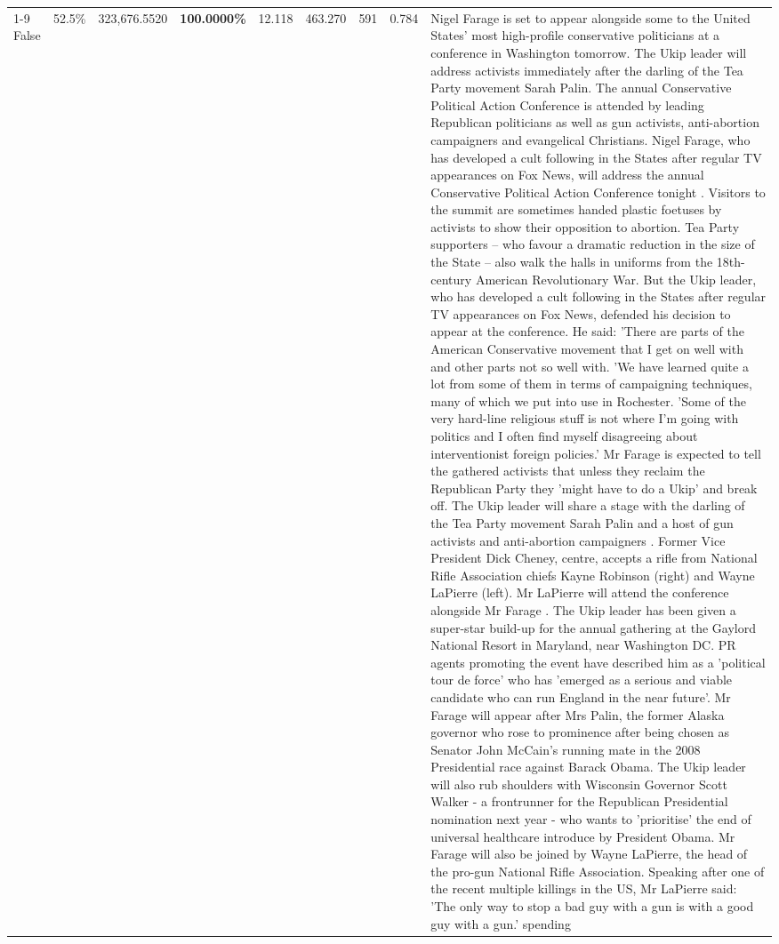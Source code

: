 \begin{table}[H]
\begin{tabular}{lllrlllll}
\cline{1-9}
False & 52.5\% & 323,676.5520 & \bfseries \color{red} 100.0000\% & 12.118 & 463.270 & 591 & 0.784 & Nigel Farage is set to appear alongside some to the United States' most high-profile conservative politicians at a conference in Washington tomorrow. The Ukip leader will address activists immediately after the darling of the Tea Party movement Sarah Palin. The annual Conservative Political Action Conference is attended by leading Republican politicians as well as gun activists, anti-abortion campaigners and evangelical Christians. Nigel Farage, who has developed a cult following in the States after regular TV appearances on Fox News, will address the annual Conservative Political Action Conference tonight . Visitors to the summit are sometimes handed plastic foetuses by activists to show their opposition to abortion. Tea Party supporters – who favour a dramatic reduction in the size of the State – also walk the halls in uniforms from the 18th-century American Revolutionary War. But the Ukip leader, who has developed a cult following in the States after regular TV appearances on Fox News, defended his decision to appear at the conference. He said: 'There are parts of the American Conservative movement that I get on well with and other parts not so well with. 'We have learned quite a lot from some of them in terms of campaigning techniques, many of which we put into use in Rochester. 'Some of the very hard-line religious stuff is not where I'm going with politics and I often find myself disagreeing about interventionist foreign policies.' Mr Farage is expected to tell the gathered activists that unless they reclaim the Republican Party they 'might have to do a Ukip' and break off. The Ukip leader will share a stage with the darling of the Tea Party movement Sarah Palin and a host of gun activists and anti-abortion campaigners . Former Vice President Dick Cheney, centre, accepts a rifle from National Rifle Association chiefs Kayne Robinson (right) and Wayne LaPierre (left). Mr LaPierre will attend the conference alongside Mr Farage . The Ukip leader has been given a super-star build-up for the annual gathering at the Gaylord National Resort in Maryland, near Washington DC. PR agents promoting the event have described him as a 'political tour de force' who has 'emerged as a serious and viable candidate who can run England in the near future'. Mr Farage will appear after Mrs Palin, the former Alaska governor who rose to prominence after being chosen as Senator John McCain's running mate in the 2008 Presidential race against Barack Obama. The Ukip leader will also rub shoulders with Wisconsin Governor Scott Walker - a frontrunner for the Republican Presidential nomination next year - who wants to 'prioritise' the end of universal healthcare introduce by President Obama. Mr Farage will also be joined by Wayne LaPierre, the head of the pro-gun National Rifle Association. Speaking after one of the recent multiple killings in the US, Mr LaPierre said: 'The only way to stop a bad guy with a gun is with a good guy with a gun.' spending \\

\end{tabular}
\end{table}

